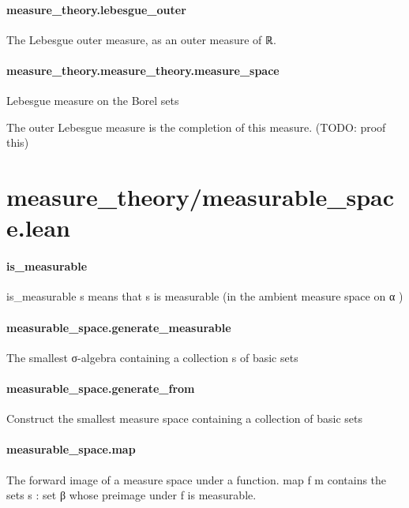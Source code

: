 \documentclass{article}
\begin{document}
\paragraph{measure\_theory.lebesgue\_outer}
\par
The Lebesgue outer measure, as an outer measure of ℝ.
\paragraph{measure\_theory.measure\_theory.measure\_space}
\par
Lebesgue measure on the Borel sets
\par
The outer Lebesgue measure is the completion of this measure. (TODO: proof this)
\section{measure\_theory/measurable\_space.lean}\paragraph{is\_measurable}
\par
\colorbox[RGB]{253,246,227}{{{{\color[RGB]{101, 123, 131} is\_measurable s }}}} means that 
\colorbox[RGB]{253,246,227}{{{{\color[RGB]{101, 123, 131} s }}}} is measurable (in the ambient measure space on 
\colorbox[RGB]{253,246,227}{{{{\color[RGB]{101, 123, 131} α }}}})
\paragraph{measurable\_space.generate\_measurable}
\par
The smallest σ-algebra containing a collection 
\colorbox[RGB]{253,246,227}{{{{\color[RGB]{101, 123, 131} s }}}} of basic sets
\paragraph{measurable\_space.generate\_from}
\par
Construct the smallest measure space containing a collection of basic sets
\paragraph{measurable\_space.map}
\par
The forward image of a measure space under a function. 
\colorbox[RGB]{253,246,227}{{{{\color[RGB]{101, 123, 131} map f m }}}} contains the sets 
\colorbox[RGB]{253,246,227}{{{{\color[RGB]{101, 123, 131} s : set β }}}}whose preimage under 
\colorbox[RGB]{253,246,227}{{{{\color[RGB]{101, 123, 131} f }}}} is measurable.
\end{document}
